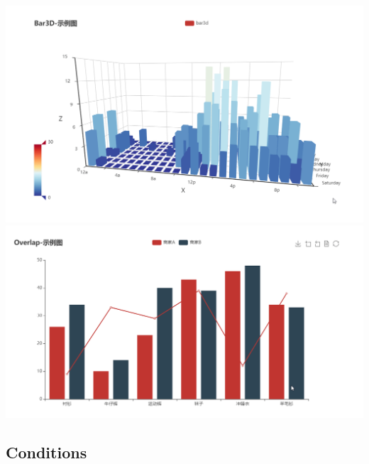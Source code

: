 \documentclass[11pt, oneside]{article}
\begin{document}
\begin{center}
\includegraphics[scale=0.3]{1_echarts_1.png}
\includegraphics[scale=0.3]{1_echarts_2.png}
\end{center}

\subsection{Conditions}
\end{document}
